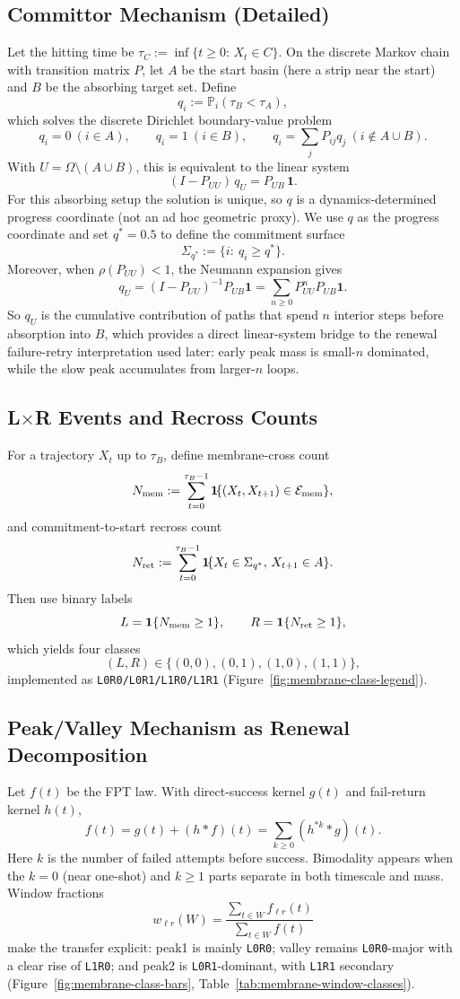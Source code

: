 \documentclass[11pt]{article}
\begin{document}
\subsection*{Committor Mechanism (Detailed)}
Let the hitting time be $\tau_C:=\inf\{t\ge 0:\,X_t\in C\}$. On the discrete Markov chain with transition matrix $P$, let $A$ be the start basin (here a strip near the start) and $B$ be the absorbing target set. Define
\[
q_i := \mathbb P_i(\tau_B < \tau_A),
\]
which solves the discrete Dirichlet boundary-value problem
\[
q_i=0\ (i\in A),\qquad q_i=1\ (i\in B),\qquad
q_i=\sum_j P_{ij} q_j\ (i\notin A\cup B).
\]
With $U=\Omega\setminus(A\cup B)$, this is equivalent to the linear system
\[
(I-P_{UU})\,q_U=P_{UB}\,\mathbf 1.
\]
For this absorbing setup the solution is unique, so $q$ is a dynamics-determined progress coordinate (not an ad hoc geometric proxy).
We use $q$ as the progress coordinate and set $q^*=0.5$ to define the commitment surface
\[
\Sigma_{q^*}:=\{i:\ q_i\ge q^*\}.
\]
Moreover, when $\rho(P_{UU})<1$, the Neumann expansion gives
\[
q_U=(I-P_{UU})^{-1}P_{UB}\mathbf 1
=\sum_{n\ge 0}P_{UU}^n P_{UB}\mathbf 1.
\]
So $q_U$ is the cumulative contribution of paths that spend $n$ interior steps before absorption into $B$, which provides a direct linear-system bridge to the renewal failure-retry interpretation used later: early peak mass is small-$n$ dominated, while the slow peak accumulates from larger-$n$ loops.

\subsection*{L$\times$R Events and Recross Counts}
For a trajectory $X_t$ up to $\tau_B$, define membrane-cross count
\[
N_{\rm mem}:=\sum_{t=0}^{\tau_B-1}\mathbf 1\!\{(X_t,X_{t+1})\in\mathcal E_{\rm mem}\},
\]
and commitment-to-start recross count
\[
N_{\rm ret}:=\sum_{t=0}^{\tau_B-1}\mathbf 1\!\{X_t\in\Sigma_{q^*},\,X_{t+1}\in A\}.
\]
Then use binary labels
\[
L=\mathbf 1\{N_{\rm mem}\ge 1\},\qquad R=\mathbf 1\{N_{\rm ret}\ge 1\},
\]
which yields four classes
\[
(\!L,R\!)\in\{(0,0),(0,1),(1,0),(1,1)\},
\]
implemented as \texttt{L0R0/L0R1/L1R0/L1R1} (Figure~\ref{fig:membrane-class-legend}).

\subsection*{Peak/Valley Mechanism as Renewal Decomposition}
Let $f(t)$ be the FPT law. With direct-success kernel $g(t)$ and fail-return kernel $h(t)$,
\[
f(t)=g(t)+(h*f)(t)=\sum_{k\ge 0}(h^{*k}*g)(t).
\]
Here $k$ is the number of failed attempts before success. Bimodality appears when the $k=0$ (near one-shot) and $k\ge1$ parts separate in both timescale and mass. Window fractions
\[
w_{\ell r}(W)=\frac{\sum_{t\in W} f_{\ell r}(t)}{\sum_{t\in W} f(t)}
\]
make the transfer explicit: peak1 is mainly \texttt{L0R0}; valley remains \texttt{L0R0}-major with a clear rise of \texttt{L1R0}; and peak2 is \texttt{L0R1}-dominant, with \texttt{L1R1} secondary (Figure~\ref{fig:membrane-class-bars}, Table~\ref{tab:membrane-window-classes}).
\end{document}
